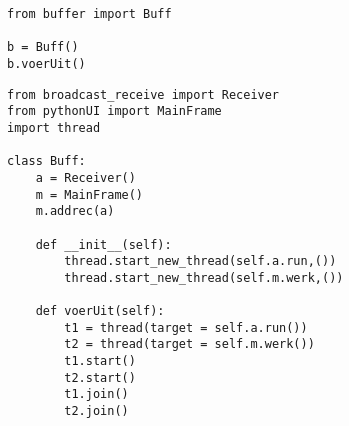 \documentclass[DIV=calc]{scrartcl}
\begin{document}
\begin{lstlisting}[caption={launcher\_rec.py}, label=launcher langs clientzijde]
from buffer import Buff
 
b = Buff()
b.voerUit()
\end{lstlisting}
\begin{lstlisting}[caption={buffer.py}, label=Threads laten starten van een functie van de Receiver en een functie van de MainFrame]
from broadcast_receive import Receiver
from pythonUI import MainFrame
import thread
 
class Buff:
    a = Receiver()
    m = MainFrame()
    m.addrec(a)
 
    def __init__(self):
        thread.start_new_thread(self.a.run,())
        thread.start_new_thread(self.m.werk,())
 
    def voerUit(self):
        t1 = thread(target = self.a.run())
        t2 = thread(target = self.m.werk())
        t1.start()
        t2.start()
        t1.join()
        t2.join()
\end{lstlisting}
\end{document}
